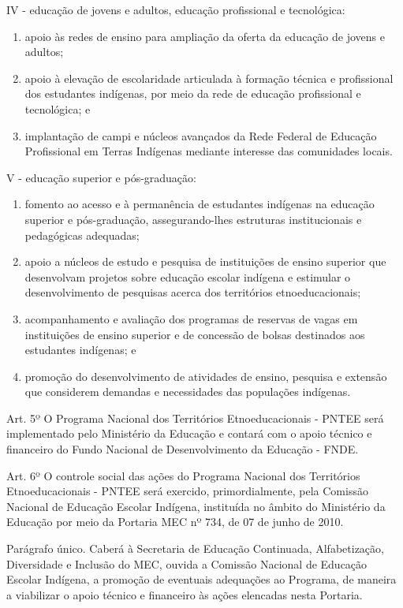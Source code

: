 \documentclass[
]{book}
\begin{document}
IV - educação de jovens e adultos, educação profissional e tecnológica:

\begin{enumerate}
\def\labelenumi{\alph{enumi})}
\item
  apoio às redes de ensino para ampliação da oferta da educação de jovens e adultos;
\item
  apoio à elevação de escolaridade articulada à formação técnica e profissional dos estudantes indígenas, por meio da rede de educação profissional e tecnológica; e
\item
  implantação de campi e núcleos avançados da Rede Federal de Educação Profissional em Terras Indígenas mediante interesse das comunidades locais.
\end{enumerate}

V - educação superior e pós-graduação:

\begin{enumerate}
\def\labelenumi{\alph{enumi})}
\item
  fomento ao acesso e à permanência de estudantes indígenas na educação superior e pós-graduação, assegurando-lhes estruturas institucionais e pedagógicas adequadas;
\item
  apoio a núcleos de estudo e pesquisa de instituições de ensino superior que desenvolvam projetos sobre educação escolar indígena e estimular o desenvolvimento de pesquisas acerca dos territórios etnoeducacionais;
\item
  acompanhamento e avaliação dos programas de reservas de vagas em instituições de ensino superior e de concessão de bolsas destinados aos estudantes indígenas; e
\item
  promoção do desenvolvimento de atividades de ensino, pesquisa e extensão que considerem demandas e necessidades das populações indígenas.
\end{enumerate}

Art. 5º O Programa Nacional dos Territórios Etnoeducacionais - PNTEE será implementado pelo Ministério da Educação e contará com o apoio técnico e financeiro do Fundo Nacional de Desenvolvimento da Educação - FNDE.

Art. 6º O controle social das ações do Programa Nacional dos Territórios Etnoeducacionais - PNTEE será exercido, primordialmente, pela Comissão Nacional de Educação Escolar Indígena, instituída no âmbito do Ministério da Educação por meio da Portaria MEC nº 734, de 07 de junho de 2010.

Parágrafo único. Caberá à Secretaria de Educação Continuada, Alfabetização, Diversidade e Inclusão do MEC, ouvida a Comissão Nacional de Educação Escolar Indígena, a promoção de eventuais adequações ao Programa, de maneira a viabilizar o apoio técnico e financeiro às ações elencadas nesta Portaria.
\end{document}
